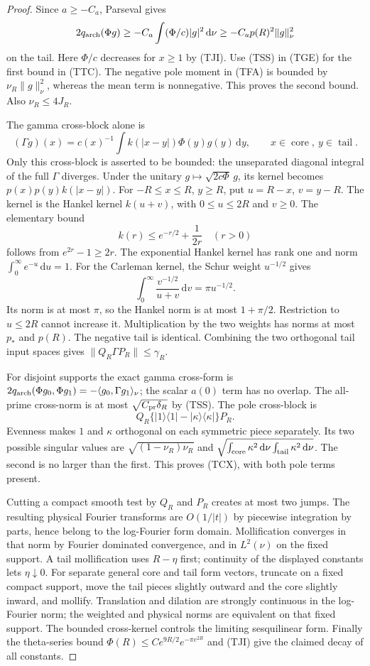 \documentclass[11pt]{article}
\theoremstyle{remark}\newtheorem{remark}[theorem]{Remark}
\newcommand{\dd}{\,\mathrm d}
\begin{document}
\begin{proof}
Since $a\ge-C_a$, Parseval gives
\[
 2q_{\rm arch}(\Phi g)\ge
      -C_a\int(\Phi/c)|g|^2\dd\nu
      \ge-C_ap(R)^2\|g\|_\nu^2
\]
on the tail. Here $\Phi/c$ decreases for $x\ge1$ by (TJI).
Use (TSS) in (TGE) for the first bound in (TTC).
The negative pole moment in (TFA) is bounded by
$\nu_R\|g\|_\nu^2$, whereas the mean term is nonnegative.
This proves the second bound. Also $\nu_R\le4J_R$.

The gamma cross-block alone is
\[
 (\Gamma g)(x)=c(x)^{-1}\int k(|x-y|)\Phi(y)g(y)\dd y,
                  \qquad x\in\operatorname{core},\ y\in\operatorname{tail}.
\]
Only this cross-block is asserted to be bounded: the unseparated
diagonal integral of the full $\Gamma$ diverges.
Under the unitary $g\mapsto\sqrt{2c\Phi}\,g$, its kernel becomes
$p(x)p(y)k(|x-y|)$. For $-R\le x\le R$, $y\ge R$, put
$u=R-x$, $v=y-R$. The kernel is the Hankel kernel $k(u+v)$,
with $0\le u\le2R$ and $v\ge0$. The elementary bound
\[
 k(r)\le e^{-r/2}+\frac1{2r}\quad(r>0)
\]
follows from $e^{2r}-1\ge2r$.
The exponential Hankel kernel has rank one and norm
$\int_0^\infty e^{-u}\dd u=1$.
For the Carleman kernel, the Schur weight $u^{-1/2}$ gives
\[
 \int_0^\infty\frac{v^{-1/2}}{u+v}\dd v=\pi u^{-1/2}.
\]
Its norm is at most $\pi$, so the Hankel norm is at most
$1+\pi/2$. Restriction to $u\le2R$ cannot increase it.
Multiplication by the two weights has norms at most $p_*$ and
$p(R)$. The negative tail is identical. Combining the two
orthogonal tail input spaces gives
$\|Q_R\Gamma P_R\|\le\gamma_R$.

For disjoint supports the exact gamma cross-form is
$2q_{\rm arch}(\Phi g_0,\Phi g_1)
=-\langle g_0,\Gamma g_1\rangle_\nu$;
the scalar $a(0)$ term has no overlap. The all-prime cross-norm
is at most $\sqrt{C_{\rm pr}\delta_R}$ by (TSS).
The pole cross-block is
\[
 Q_R\{|1\rangle\langle1|-|\kappa\rangle\langle\kappa|\}P_R.
\]
Evenness makes $1$ and $\kappa$ orthogonal on each symmetric
piece separately. Its two possible singular values are
$\sqrt{(1-\nu_R)\nu_R}$ and
$\sqrt{\int_{\rm core}\kappa^2\dd\nu
               \int_{\rm tail}\kappa^2\dd\nu}$.
The second is no larger than the first. This proves (TCX),
with both pole terms present.

Cutting a compact smooth test by $Q_R$ and $P_R$ creates at most
two jumps. The resulting physical Fourier transforms are
$O(1/|t|)$ by piecewise integration by parts, hence belong to
the log-Fourier form domain. Mollification converges in that norm
by Fourier dominated convergence, and in $L^2(\nu)$ on the fixed
support. A tail mollification uses $R-\eta$ first; continuity of
the displayed constants lets $\eta\downarrow0$.
For separate general core and tail form vectors, truncate on a
fixed compact support, move the tail pieces slightly outward and
the core slightly inward, and mollify. Translation and dilation
are strongly continuous in the log-Fourier norm; the weighted and
physical norms are equivalent on that fixed support. The bounded
cross-kernel controls the limiting sesquilinear form.
Finally the theta-series bound
$\Phi(R)\le C e^{9R/2}e^{-\pi e^{2R}}$ and (TJI) give the
claimed decay of all constants.
\end{proof}
\end{document}
